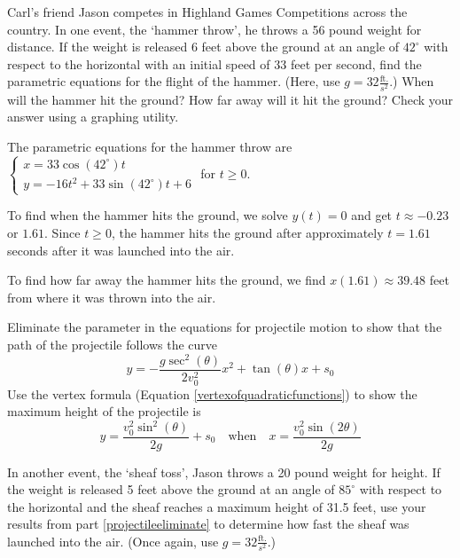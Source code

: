 \documentclass{ximera}
\begin{document}
\begin{question}
\begin{center}
\end{center}

\begin{problem}
Carl's friend Jason competes in Highland Games Competitions across the country.  In one event, the `hammer throw',  he throws a 56 pound weight for distance. If the weight is released $6$ feet above the ground at an angle of $42^{\circ}$ with respect to the horizontal with an initial speed of $33$ feet per second, find the parametric equations for the flight of the hammer.  (Here, use $g = 32 \frac{\text{ft.}}{s^2}$.) When will the hammer hit the ground?  How far away will it hit the ground? Check your answer using a graphing utility.

\begin{solution}
The parametric equations for the hammer throw are ${ \left\{ \begin{array}{l} x = 33 \cos(42^{\circ}) t \\ [4pt] y =-16t^2 +  33 \sin(42^{\circ}) t + 6 \end{array} \right.}$ for $t \geq 0$.

To find when the hammer hits the ground, we solve $y(t) = 0$ and get $t \approx -0.23$ or $1.61$.  Since $t \geq 0$, the hammer hits the ground after approximately $t = 1.61$ seconds after it was launched into the air. 

To find how far away the hammer hits the ground, we find $x(1.61) \approx 39.48$ feet from where it was thrown into the air.

\end{solution}
\end{problem}

\begin{problem} \label{projectileeliminate} 
Eliminate the parameter in the equations for projectile motion to show that the path of the projectile follows the curve \[y = -\frac{g \sec^{2}(\theta)}{2 v_{0}^2} x^2 + \tan(\theta) x + s_{0}\] Use the vertex formula (Equation \ref{vertexofquadraticfunctions}) to show the maximum height of the projectile is \[y = \frac{v_{0}^2 \sin^{2}(\theta)}{2g} + s_{0} \quad \text{when} \quad x = \frac{v_{0}^2 \sin(2\theta) }{2g}\] 
\end{problem}

\begin{problem}
 In another event, the `sheaf toss', Jason throws a  20 pound weight for height.  If the weight is released  5 feet above the ground at an angle of $85^{\circ}$ with respect to the horizontal and the sheaf reaches a maximum height of 31.5 feet, use your results from part  \ref{projectileeliminate} to determine how fast the sheaf was launched into the air.  (Once again, use $g = 32 \frac{\text{ft.}}{s^2}$.)


\end{problem}
\end{question}
\end{document}

